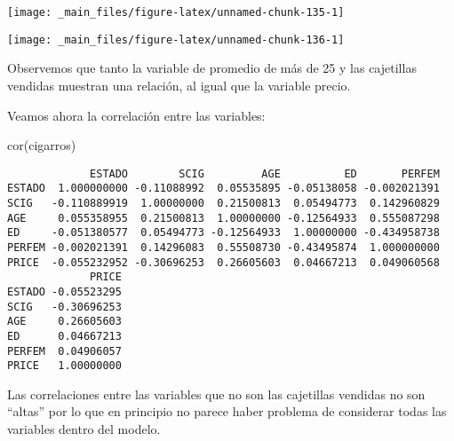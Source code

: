\documentclass[
  a4paper,
  oneside,
  openany]{book}
\newenvironment{Shaded}{\begin{snugshade}}{\end{snugshade}}
\newcommand{\AttributeTok}[1]{\textcolor[rgb]{0.77,0.63,0.00}{#1}}
\newcommand{\DecValTok}[1]{\textcolor[rgb]{0.00,0.00,0.81}{#1}}
\newcommand{\FunctionTok}[1]{\textcolor[rgb]{0.00,0.00,0.00}{#1}}
\newcommand{\NormalTok}[1]{#1}
\newcommand{\SpecialCharTok}[1]{\textcolor[rgb]{0.00,0.00,0.00}{#1}}
\newcommand{\StringTok}[1]{\textcolor[rgb]{0.31,0.60,0.02}{#1}}
\begin{document}
\begin{center}\texttt{[image: \_main\_files/figure-latex/unnamed-chunk-135-1]} \end{center}

\begin{Shaded}
\end{Shaded}

\begin{center}\texttt{[image: \_main\_files/figure-latex/unnamed-chunk-136-1]} \end{center}

Observemos que tanto la variable de promedio de más de 25 y las cajetillas vendidas muestran una relación, al igual que la variable precio.

Veamos ahora la correlación entre las variables:

\begin{Shaded}
\begin{Highlighting}[]
\FunctionTok{cor}\NormalTok{(cigarros)}
\end{Highlighting}
\end{Shaded}

\begin{verbatim}
             ESTADO        SCIG         AGE          ED       PERFEM
ESTADO  1.000000000 -0.11088992  0.05535895 -0.05138058 -0.002021391
SCIG   -0.110889919  1.00000000  0.21500813  0.05494773  0.142960829
AGE     0.055358955  0.21500813  1.00000000 -0.12564933  0.555087298
ED     -0.051380577  0.05494773 -0.12564933  1.00000000 -0.434958738
PERFEM -0.002021391  0.14296083  0.55508730 -0.43495874  1.000000000
PRICE  -0.055232952 -0.30696253  0.26605603  0.04667213  0.049060568
             PRICE
ESTADO -0.05523295
SCIG   -0.30696253
AGE     0.26605603
ED      0.04667213
PERFEM  0.04906057
PRICE   1.00000000
\end{verbatim}

Las correlaciones entre las variables que no son las cajetillas vendidas no son ``altas'' por lo que en principio no parece haber problema de considerar todas las variables dentro del modelo.
\end{document}
